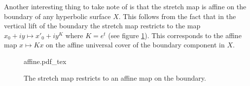 \begin{rem}
  Another interesting thing to take note of is that the stretch map is affine on the boundary of any hyperbolic surface $X$. This follows from the fact that in the vertical lift of the boundary the stretch map restricts to the map $x_0+iy \mapsto x'_0+iy^K$ where $K=e^t$ (see figure \ref{fig:affine}). This corresponds to the affine map $x\mapsto Kx$ on the affine universal cover of the boundary component in $X$. 
\end{rem}
\begin{figure}[h]
  \centering
  \tiny
  \def\svgwidth{\textwidth}
  {affine.pdf_tex}
  \caption[Stretch Maps on the boundary]{The stretch map restricts to an affine map on the boundary.}
  \label{fig:affine}
\end{figure}
